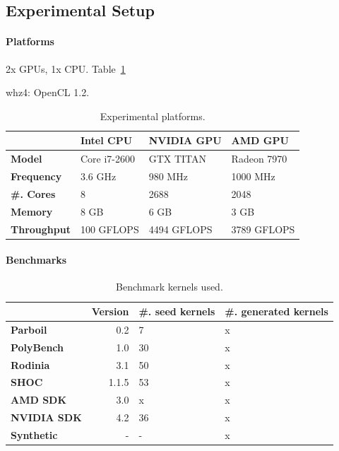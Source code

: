 \documentclass[preprint,nonatbib,10pt,nocopyrightspace]{sigplanconf}
\begin{document}
\subsection{Experimental Setup}\label{subsec:}

\paragraph{Platforms} 2x GPUs, 1x CPU. Table~\ref{tab:platforms}

whz4: OpenCL 1.2.

\begin{table}%
\scriptsize
\centering
\begin{tabular}{l l l l}
  \toprule
  & \textbf{Intel CPU} & \textbf{NVIDIA GPU} & \textbf{AMD GPU} \\
  \midrule
  \textbf{Model} & Core i7-2600 & GTX TITAN & Radeon 7970 \\
  \textbf{Frequency} & 3.6 GHz & 980 MHz & 1000 MHz \\
  \textbf{\#. Cores} & 8 & 2688 & 2048 \\
  \textbf{Memory} & 8 GB & 6 GB & 3 GB \\
  \textbf{Throughput} & 100 GFLOPS & 4494 GFLOPS & 3789 GFLOPS \\
  \bottomrule
\end{tabular}
\caption{Experimental platforms.}
\label{tab:platforms}
\end{table}


\paragraph{Benchmarks}

\begin{table}%
\scriptsize
\centering
\begin{tabular}{l r R{2cm} R{2cm}}
  \toprule
  & \textbf{Version} & \textbf{\#. seed kernels} & \textbf{\#. generated kernels}\\
  \midrule
  \textbf{Parboil~\cite{Stratton2012}} & 0.2 & 7 & x \\
  \textbf{PolyBench~\cite{Grauer-Gray2012}} & 1.0 & 30 & x \\
  \textbf{Rodinia~\cite{Che2009}} & 3.1 & 50 & x \\
  \textbf{SHOC~\cite{Danalis2010}} & 1.1.5 & 53 & x \\
  \textbf{AMD SDK} & 3.0 & x & x \\
  \textbf{NVIDIA SDK} & 4.2 & 36 & x \\
  \textbf{Synthetic} & - & - & x \\
  \bottomrule
\end{tabular}
\caption{%
  Benchmark kernels used.
}
\label{tab:benchmarks}
\end{table}
\end{document}
